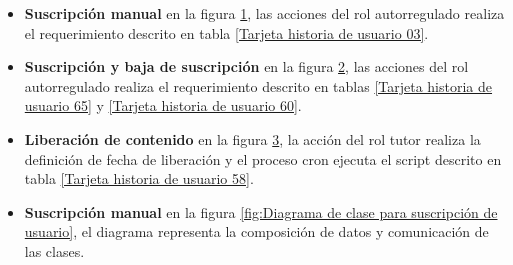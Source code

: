 \begin{itemize}

\item \textbf{Suscripción manual}
en la figura \ref{fig:Diagrama de caso de uso registrar suscripción de usuario},
las acciones del rol autorregulado realiza el requerimiento descrito en tabla
\ref{Tarjeta historia de usuario 03}.

\begin{figure}[!ht]
	\centering
	\label{fig:Diagrama de caso de uso registrar suscripción de usuario}
\end{figure}

\item \textbf{Suscripción y baja de suscripción}
en la figura \ref{fig:Diagrama de caso de uso para personalizar suscripción, dar baja},
las acciones del rol autorregulado realiza el requerimiento descrito en tablas
\ref{Tarjeta historia de usuario 65} y \ref{Tarjeta historia de usuario 60}.

\begin{figure}[!ht]
	\centering
	\label{fig:Diagrama de caso de uso para personalizar suscripción, dar baja}
\end{figure}

\item \textbf{Liberación de contenido} en la figura 
\ref{fig:Diagrama de caso de uso para liberación de contenido}, la acción del
rol tutor realiza la definición de fecha de liberación y el proceso cron
ejecuta el script descrito en tabla \ref{Tarjeta historia de usuario 58}.

\begin{figure}[!ht]
	\centering
	\label{fig:Diagrama de caso de uso para liberación de contenido}
\end{figure}

\item \textbf{Suscripción manual}
en la figura \ref{fig:Diagrama de clase para suscripción de usuario}, el diagrama
representa la composición de datos y comunicación de las clases.


\end{itemize}
